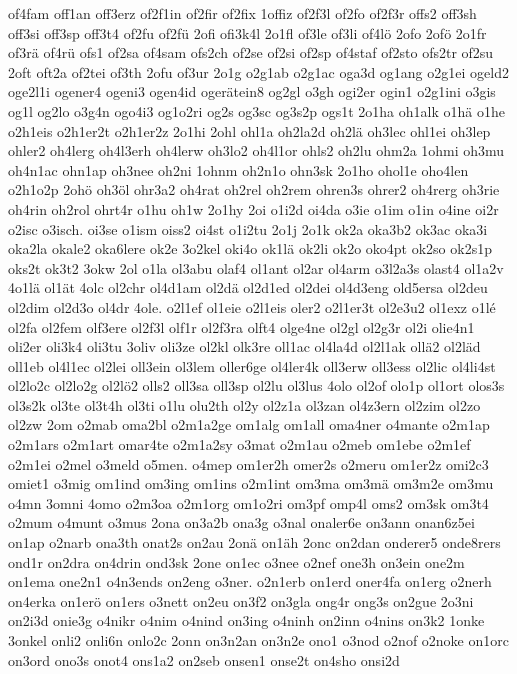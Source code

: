 {of4fam
off1an
off3erz
of2f1in
of2fir
of2fix
1offiz
of2f3l
of2fo
of2f3r
offs2
off3sh
off3si
off3sp
off3t4
of2fu
of2fü
2ofi
ofi3k4l
2o1fl
of3le
of3li
of4lö
2ofo
2ofö
2o1fr
of3rä
of4rü
ofs1
of2sa
of4sam
ofs2ch
of2se
of2si
of2sp
of4staf
of2sto
ofs2tr
of2su
2oft
oft2a
of2tei
of3th
2ofu
of3ur
2o1g
o2g1ab
o2g1ac
oga3d
og1ang
o2g1ei
ogeld2
oge2l1i
ogener4
ogeni3
ogen4id
ogerätein8
og2gl
o3gh
ogi2er
ogin1
o2g1ini
o3gis
og1l
og2lo
o3g4n
ogo4i3
og1o2ri
og2s
og3sc
og3s2p
ogs1t
2o1ha
oh1alk
o1hä
o1he
o2h1eis
o2h1er2t
o2h1er2z
2o1hi
2ohl
ohl1a
oh2la2d
oh2lä
oh3lec
ohl1ei
oh3lep
ohler2
oh4lerg
oh4l3erh
oh4lerw
oh3lo2
oh4l1or
ohls2
oh2lu
ohm2a
1ohmi
oh3mu
oh4n1ac
ohn1ap
oh3nee
oh2ni
1ohnm
oh2n1o
ohn3sk
2o1ho
ohol1e
oho4len
o2h1o2p
2ohö
oh3öl
ohr3a2
oh4rat
oh2rel
oh2rem
ohren3s
ohrer2
oh4rerg
oh3rie
oh4rin
oh2rol
ohrt4r
o1hu
oh1w
2o1hy
2oi
o1i2d
oi4da
o3ie
o1im
o1in
o4ine
oi2r
o2isc
o3isch.
oi3se
o1ism
oiss2
oi4st
o1i2tu
2o1j
2o1k
ok2a
oka3b2
ok3ac
oka3i
oka2la
okale2
oka6lere
ok2e
3o2kel
oki4o
ok1lä
ok2li
ok2o
oko4pt
ok2so
ok2s1p
oks2t
ok3t2
3okw
2ol
o1la
ol3abu
olaf4
ol1ant
ol2ar
ol4arm
o3l2a3s
olast4
ol1a2v
4o1lä
ol1ät
4olc
ol2chr
ol4d1am
ol2dä
ol2d1ed
ol2dei
ol4d3eng
old5ersa
ol2deu
ol2dim
ol2d3o
ol4dr
4ole.
o2l1ef
ol1eie
o2l1eis
oler2
o2l1er3t
ol2e3u2
ol1exz
o1lé
ol2fa
ol2fem
olf3ere
ol2f3l
olf1r
ol2f3ra
olft4
olge4ne
ol2gl
ol2g3r
ol2i
olie4n1
oli2er
oli3k4
oli3tu
3oliv
oli3ze
ol2kl
olk3re
oll1ac
ol4la4d
ol2l1ak
ollä2
ol2läd
oll1eb
ol4l1ec
ol2lei
oll3ein
ol3lem
oller6ge
ol4ler4k
oll3erw
oll3ess
ol2lic
ol4li4st
ol2lo2c
ol2lo2g
ol2lö2
olls2
oll3sa
oll3sp
ol2lu
ol3lus
4olo
ol2of
olo1p
ol1ort
olos3s
ol3s2k
ol3te
ol3t4h
ol3ti
o1lu
olu2th
ol2y
ol2z1a
ol3zan
ol4z3ern
ol2zim
ol2zo
ol2zw
2om
o2mab
oma2bl
o2m1a2ge
om1alg
om1all
oma4ner
o4mante
o2m1ap
o2m1ars
o2m1art
omar4te
o2m1a2sy
o3mat
o2m1au
o2meb
om1ebe
o2m1ef
o2m1ei
o2mel
o3meld
o5men.
o4mep
om1er2h
omer2s
o2meru
om1er2z
omi2c3
omiet1
o3mig
om1ind
om3ing
om1ins
o2m1int
om3ma
om3mä
om3m2e
om3mu
o4mn
3omni
4omo
o2m3oa
o2m1org
om1o2ri
om3pf
omp4l
oms2
om3sk
om3t4
o2mum
o4munt
o3mus
2ona
on3a2b
ona3g
o3nal
onaler6e
on3ann
onan6z5ei
on1ap
o2narb
ona3th
onat2s
on2au
2onä
on1äh
2onc
on2dan
onderer5
onde8rers
ond1r
on2dra
on4drin
ond3sk
2one
on1ec
o3nee
o2nef
one3h
on3ein
one2m
on1ema
one2n1
o4n3ends
on2eng
o3ner.
o2n1erb
on1erd
oner4fa
on1erg
o2nerh
on4erka
on1erö
on1ers
o3nett
on2eu
on3f2
on3gla
ong4r
ong3s
on2gue
2o3ni
on2i3d
onie3g
o4nikr
o4nim
o4nind
on3ing
o4ninh
on2inn
o4nins
on3k2
1onke
3onkel
onli2
onli6n
onlo2c
2onn
on3n2an
on3n2e
ono1
o3nod
o2nof
o2noke
on1orc
on3ord
ono3s
onot4
ons1a2
on2seb
onsen1
onse2t
on4sho
onsi2d
}
